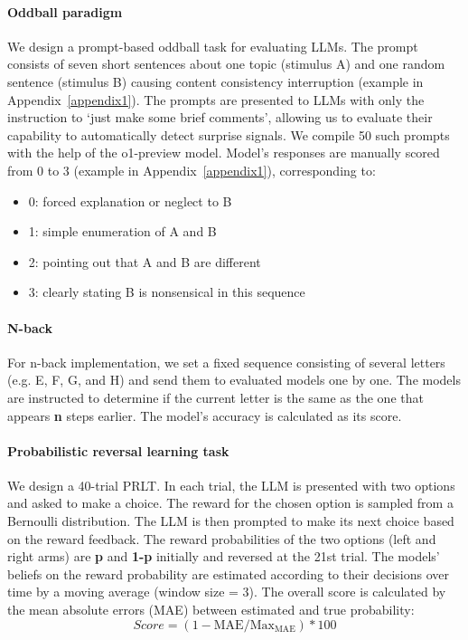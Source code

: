 \paragraph{Oddball paradigm} We design a prompt-based oddball task for evaluating LLMs. The prompt consists of seven short sentences about one topic (stimulus A) and one random sentence (stimulus B) causing content consistency interruption (example in Appendix~\ref{appendix1}). The prompts are presented to LLMs with only the instruction to `just make some brief comments', allowing us to evaluate their capability to automatically detect surprise signals. We compile 50 such prompts with the help of the o1-preview model. Model's responses are manually scored from 0 to 3  (example in Appendix~\ref{appendix1}), corresponding to:
\begin{itemize}
    \item 0: forced explanation or neglect to B
    \item 1: simple enumeration of A and B
    \item  2: pointing out that A and B are different
    \item 3: clearly stating B is nonsensical in this sequence
\end{itemize}

\paragraph{N-back} For n-back implementation, we set a fixed sequence consisting of several letters (e.g. E, F, G, and H) and send them to evaluated models one by one. The models are instructed to determine if the current letter is the same as the one that appears \textbf{n} steps earlier. The model's accuracy is calculated as its score. 

\paragraph{Probabilistic reversal learning task} We design a 40-trial PRLT. In each trial, the LLM is presented with two options and asked to make a choice. The reward for the chosen option is sampled from a Bernoulli distribution. The LLM is then prompted to make its next choice based on the reward feedback. The reward probabilities of the two options (left and right arms) are \textbf{p} and \textbf{1-p} initially and reversed at the 21st trial. The models' beliefs on the reward probability are estimated according to their decisions over time by a moving average (window size = 3). The overall score is calculated by the mean absolute errors (MAE) between estimated and true probability:
\[Score = (1 - \text{MAE}/\text{Max}_{\text{MAE}})*100\]
